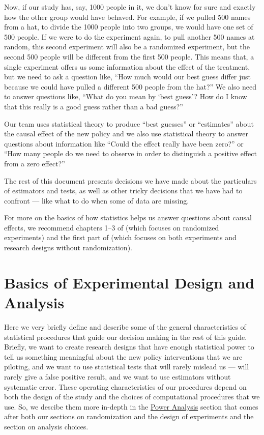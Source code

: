 \documentclass[
  12pt,
]{book}
\theoremstyle{definition}
\theoremstyle{definition}
\theoremstyle{definition}
\theoremstyle{remark}
\begin{document}
Now, if our study has, say, 1000 people in it, we don't know for sure
and exactly how the other group would have behaved. For example, if we
pulled 500 names from a hat, to divide the 1000 people into two groups,
we would have one set of 500 people. If we were to do the experiment
again, to pull another 500 names at random, this second experiment will
also be a randomized experiment, but the second 500 people will be
different from the first 500 people. This means that, a single
experiment offers us some information about the effect of the treatment,
but we need to ask a question like, ``How much would our best guess
differ just because we could have pulled a different 500 people from the
hat?'' We also need to answer questions like, ``What do you mean by
`best guess'? How do I know that this really is a good guess rather than
a bad guess?''

Our team uses statistical theory to produce ``best guesses'' or
``estimates'' about the causal effect of the new policy and we also use
statistical theory to answer questions about information like ``Could
the effect really have been zero?'' or ``How many people do we need to
observe in order to distinguish a positive effect from a zero effect?''

The rest of this document presents decisions we have made about the
particulars of estimators and tests, as well as other tricky decisions
that we have had to confront --- like what to do when some of data are
missing.

For more on the basics of how statistics helps us answer questions about
causal effects, we recommend chapters 1--3 of \citet{gerber_field_2012}
(which focuses on randomized experiments) and the first part of
\citet{rosenbaum2017} (which focuses on both experiments and research
designs without randomization).

\hypertarget{basics-of-experimental-design-and-analysis}{%
\chapter{Basics of Experimental Design and
Analysis}\label{basics-of-experimental-design-and-analysis}}

Here we very briefly define and describe some of the general
characteristics of statistical procedures that guide our decision making
in the rest of this guide. Briefly, we want to create research designs
that have enough statistical power to tell us something meaningful about
the new policy interventions that we are piloting, and we want to use
statistical tests that will rarely mislead us --- will rarely give a
false positive result, and we want to use estimators without systematic
error. These operating characteristics of our procedures depend on both
the design of the study and the choices of computational procedures that
we use. So, we descibe them more in-depth in the
\protect\hyperlink{poweranalysis}{Power Analysis} section that comes
after both our sections on randomization and the design of experiments
and the section on analysis choices.
\end{document}
